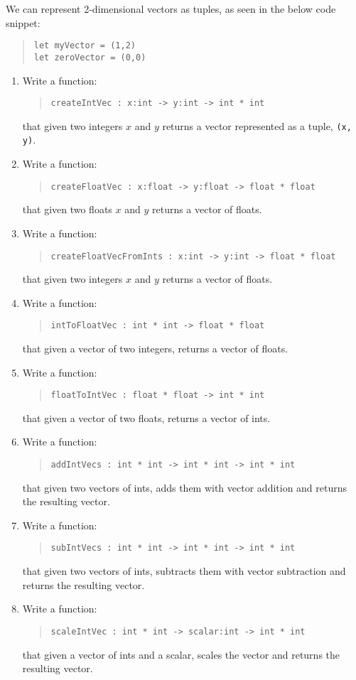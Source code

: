 We can represent 2-dimensional vectors as tuples, as seen in the below code snippet:
  \begin{quote}
    \mbox{\lstinline!let myVector = (1,2)!} \\
    \mbox{\lstinline!let zeroVector = (0,0)!}
  \end{quote}




\begin{enumerate}
  \item Write a function:
  \begin{quote}
    \mbox{\lstinline!createIntVec : x:int -> y:int -> int * int!}
  \end{quote}
  that given two integers $x$ and $y$ returns a vector represented as a tuple, \lstinline{(x, y)}.
\item Write a function:
  \begin{quote}
    \mbox{\lstinline!createFloatVec : x:float -> y:float -> float * float!}
  \end{quote}
  that given two floats $x$ and $y$ returns a vector of floats.
\item Write a function:
  \begin{quote}
    \mbox{\lstinline!createFloatVecFromInts : x:int -> y:int -> float * float!}
  \end{quote}
  that given two integers $x$ and $y$ returns a vector of floats.
\item Write a function:
  \begin{quote}
    \mbox{\lstinline!intToFloatVec : int * int -> float * float!}
  \end{quote}
  that given a vector of two integers, returns a vector of floats.
\item Write a function:
  \begin{quote}
    \mbox{\lstinline!floatToIntVec : float * float -> int * int!}
  \end{quote}
  that given a vector of two floats, returns a vector of ints.

\item Write a function:
  \begin{quote}
    \mbox{\lstinline!addIntVecs : int * int -> int * int -> int * int!}
  \end{quote}
  that given two vectors of ints, adds them with vector addition and returns the resulting vector.

\item Write a function:
  \begin{quote}
    \mbox{\lstinline!subIntVecs : int * int -> int * int -> int * int!}
  \end{quote}
  that given two vectors of ints, subtracts them with vector subtraction and returns the resulting vector.

\item Write a function:
  \begin{quote}
    \mbox{\lstinline!scaleIntVec : int * int -> scalar:int -> int * int!}
  \end{quote}
  that given a vector of ints and a scalar, scales the vector and returns the resulting vector.
  
  
  
\end{enumerate}